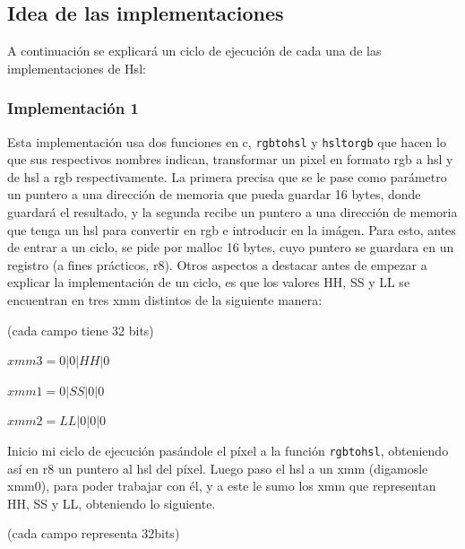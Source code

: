 \documentclass[a4paper]{article}
\begin{document}
\subsection{Idea de las implementaciones}
A continuación se explicará un ciclo de ejecución de cada una de las implementaciones de Hsl:

\subsubsection{Implementación 1}

Esta implementación usa dos funciones en c, {\tt rgbtohsl} y {\tt hsltorgb} que hacen lo que sus respectivos nombres indican, transformar un pixel en formato rgb a hsl y de hsl a rgb respectivamente. La primera precisa que se le pase como parámetro un puntero a una dirección de memoria que pueda guardar 16 bytes, donde guardará el resultado, y la segunda recibe un puntero a una dirección de memoria que tenga un hsl para convertir en rgb e introducir en la imágen. Para esto, antes de entrar a un ciclo, se pide por malloc 16 bytes, cuyo puntero se guardara en un registro (a fines prácticos, r8).
Otros aspectos a destacar antes de empezar a explicar la implementación de un ciclo, es que los valores HH, SS y LL se encuentran en tres xmm distintos de la siguiente manera:

\vspace*{0.3cm}

(cada campo tiene 32 bits)

\vspace*{0.3cm}

$xmm3=0|0|HH|0$

\vspace*{0.3cm} 

$xmm1=0|SS|0|0$

\vspace*{0.3cm}

$xmm2=LL|0|0|0$

\vspace*{0.3cm}

Inicio mi ciclo de ejecución pasándole el píxel a la función {\tt rgbtohsl}, obteniendo así en r8 un puntero al hsl del píxel. Luego paso el hsl a un xmm (digamosle xmm0), para poder trabajar con él, y a este le sumo los xmm que representan HH, SS y LL, obteniendo lo siguiente.

(cada campo representa 32bits)

\vspace*{0.3cm}
\end{document}
